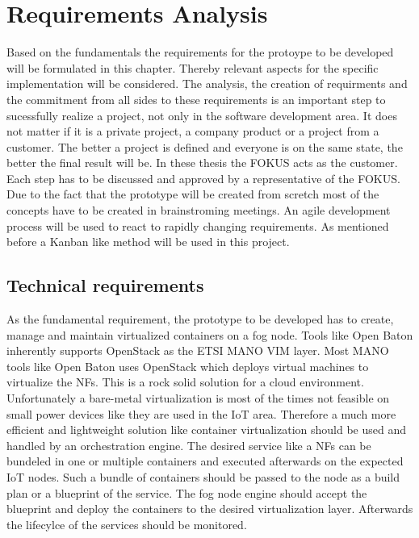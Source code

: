 \chapter{Requirements Analysis}
\label{chapter:requirements-analysis}
Based on the fundamentals the requirements for the protoype to be developed will be formulated in this chapter.
Thereby relevant aspects for the specific implementation will be considered.
The analysis, the creation of requirments and the commitment from all sides to these requirements is an important step to sucessfully realize a project, not only in the software development area.
It does not matter if it is a private project, a company product or a project from a customer.
The better a project is defined and everyone is on the same state, the better the final result will be.
In these thesis the \ac{FOKUS} acts as the customer.
Each step has to be discussed and approved by a representative of the \ac{FOKUS}.
Due to the fact that the prototype will be created from scretch most of the concepts have to be created in brainstroming meetings.
An agile development process will be used to react to rapidly changing requirements.
As mentioned before a Kanban like method will be used in this project.


\section{Technical requirements}
\label{section:technical-requirements}
As the fundamental requirement, the prototype to be developed has to create, manage and maintain virtualized containers on a fog node.
Tools like Open Baton inherently supports OpenStack as the \ac{ETSI} \ac{MANO} \ac{VIM} layer.
Most \ac{MANO} tools like Open Baton uses OpenStack which deploys virtual machines to virtualize the \acp{NF}.
This is a rock solid solution for a cloud environment.
Unfortunately a bare-metal virtualization is most of the times not feasible on small power devices like they are used in the \ac{IoT} area.
Therefore a much more efficient and lightweight solution like container virtualization should be used and handled by an orchestration engine.
The desired service like a \acp{NF} can be bundeled in one or multiple containers and executed afterwards on the expected \ac{IoT} nodes.
Such a bundle of containers should be passed to the node as a build plan or a blueprint of the service.
The fog node engine should accept the blueprint and deploy the containers to the desired virtualization layer.
Afterwards the lifecylce of the services should be monitored.

